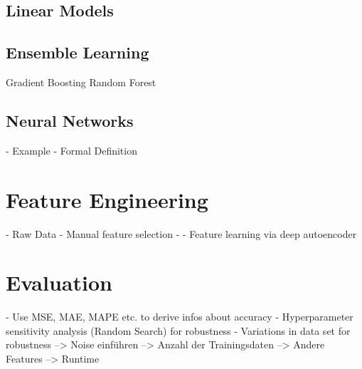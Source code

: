 \subsection{Linear Models}

\subsection{Ensemble Learning}

Gradient Boosting
Random Forest
\subsection{Neural Networks}
- Example
- Formal Definition

\section{Feature Engineering}

- Raw Data 
- Manual feature selection
- 
- Feature learning via deep autoencoder

\section{Evaluation} 
- Use MSE, MAE, MAPE etc. to derive infos about accuracy
- Hyperparameter sensitivity analysis (Random Search) for robustness
- Variations in data set for robustness
--> Noise einführen 
--> Anzahl der Trainingsdaten
--> Andere Features
--> Runtime